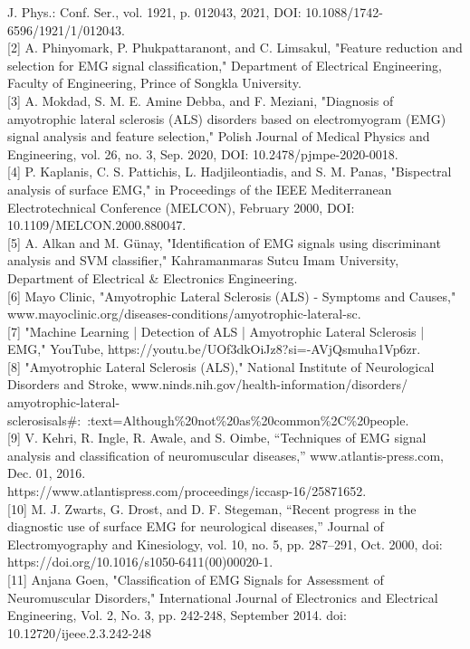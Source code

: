 \documentclass[ 12pt,a4paper,twocolumn,fleqn]{report}
\begin{document}
J. Phys.: Conf. Ser., vol. 1921, p. 012043, 2021, DOI: 10.1088/1742-6596/1921/1/012043.
\\
\hfill
[2] A. Phinyomark, P. Phukpattaranont, and C. Limsakul, "Feature reduction and selection for EMG
signal classification," Department of Electrical Engineering, Faculty of Engineering, Prince of Songkla
University.
\\
\hfill
[3] A. Mokdad, S. M. E. Amine Debba, and F. Meziani, "Diagnosis of amyotrophic lateral sclerosis
(ALS) disorders based on electromyogram (EMG) signal analysis and feature selection," Polish Journal
of Medical Physics and Engineering, vol. 26, no. 3, Sep. 2020, DOI: 10.2478/pjmpe-2020-0018.
\\
\hfill
[4] P. Kaplanis, C. S. Pattichis, L. Hadjileontiadis, and S. M. Panas, "Bispectral analysis of surface
EMG," in Proceedings of the IEEE Mediterranean Electrotechnical Conference (MELCON), February
2000, DOI: 10.1109/MELCON.2000.880047.
\\
\hfill
[5] A. Alkan and M. Günay, "Identification of EMG signals using discriminant analysis and SVM
classifier," Kahramanmaras Sutcu Imam University, Department of Electrical \& Electronics
Engineering.
\\
\hfill
[6] Mayo Clinic, "Amyotrophic Lateral Sclerosis (ALS) - Symptoms and Causes,"\\
www.mayoclinic.org/diseases-conditions/amyotrophic-lateral-sc.
\\
\hfill
[7] "Machine Learning | Detection of ALS | Amyotrophic Lateral Sclerosis | EMG," YouTube,
https://youtu.be/UOf3dkOiJz8?si=-AVjQsmuha1Vp6zr.
\\
\hfill
[8] "Amyotrophic Lateral Sclerosis (ALS)," National Institute of Neurological Disorders and Stroke,
www.ninds.nih.gov/health-information/disorders/\\
amyotrophic-lateral-sclerosisals\#:~:text=Although\%20not\%20as\%20common\%2C\%20people.
\\
\hfill
[9] V. Kehri, R. Ingle, R. Awale, and S. Oimbe, “Techniques of EMG signal analysis and classification
of neuromuscular diseases,” www.atlantis-press.com, Dec. 01, 2016. \\https://www.atlantispress.com/proceedings/iccasp-16/25871652.
\\
\hfill
[10] M. J. Zwarts, G. Drost, and D. F. Stegeman, “Recent progress in the diagnostic use of surface
EMG for neurological diseases,” Journal of Electromyography and Kinesiology, vol. 10, no. 5, pp.
287–291, Oct. 2000, doi: https://doi.org/10.1016/s1050-6411(00)00020-1.
\\
\hfill
[11] Anjana Goen, "Classification of EMG Signals for Assessment of Neuromuscular Disorders,"
International Journal of Electronics and Electrical Engineering, Vol. 2, No. 3, pp. 242-248, September
2014. doi: 10.12720/ijeee.2.3.242-248
\end{document}
